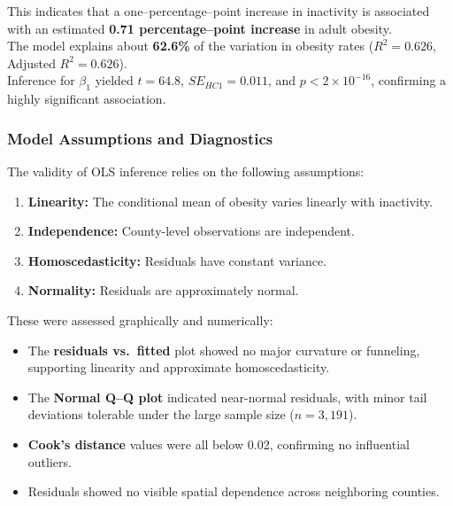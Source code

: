 \documentclass[
  letterpaper,
  DIV=11,
  numbers=noendperiod]{scrartcl}
\providecommand{\tightlist}{%
  \setlength{\itemsep}{0pt}\setlength{\parskip}{0pt}}\usepackage{longtable,booktabs,array}
\begin{document}
This indicates that a one--percentage--point increase in inactivity is
associated with an estimated \textbf{0.71 percentage--point increase} in
adult obesity.\\
The model explains about \textbf{62.6\%} of the variation in obesity
rates (\(R^2 = 0.626\), Adjusted \(R^2 = 0.626\)).\\
Inference for \(\beta_1\) yielded \(t = 64.8\), \(SE_{HC1} = 0.011\),
and \(p < 2 \times 10^{-16}\), confirming a highly significant
association.

\subsubsection{Model Assumptions and
Diagnostics}\label{model-assumptions-and-diagnostics}

The validity of OLS inference relies on the following assumptions:

\begin{enumerate}
\def\labelenumi{\arabic{enumi}.}
\tightlist
\item
  \textbf{Linearity:} The conditional mean of obesity varies linearly
  with inactivity.\\
\item
  \textbf{Independence:} County-level observations are independent.\\
\item
  \textbf{Homoscedasticity:} Residuals have constant variance.\\
\item
  \textbf{Normality:} Residuals are approximately normal.
\end{enumerate}

These were assessed graphically and numerically:

\begin{itemize}
\tightlist
\item
  The \textbf{residuals vs.~fitted} plot showed no major curvature or
  funneling, supporting linearity and approximate homoscedasticity.\\
\item
  The \textbf{Normal Q--Q plot} indicated near-normal residuals, with
  minor tail deviations tolerable under the large sample size
  (\(n = 3{,}191\)).\\
\item
  \textbf{Cook's distance} values were all below 0.02, confirming no
  influential outliers.\\
\item
  Residuals showed no visible spatial dependence across neighboring
  counties.
\end{itemize}
\end{document}
